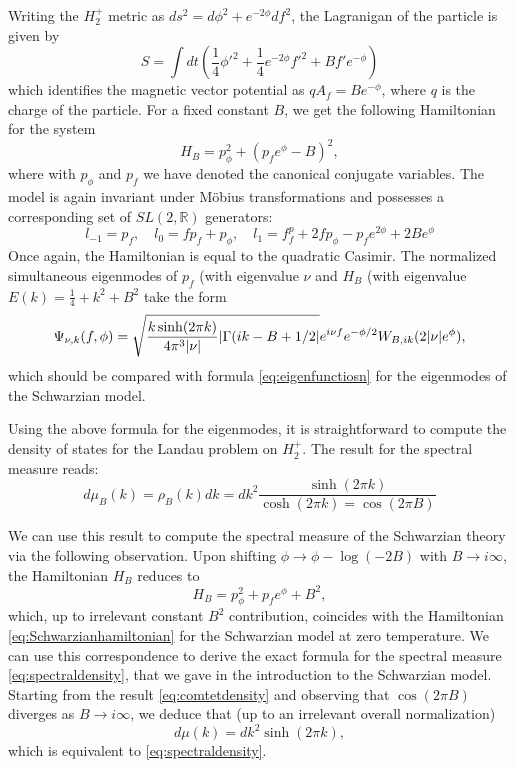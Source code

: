 Writing the $H^+_2$ metric as $ds^2 = d\phi^2 + e^{-2\phi}df^2$, the Lagranigan of the particle is given by 
\begin{equation}
S = \int{dt\left(\frac{1}{4}\phi'^2 + \frac{1}{4}e^{-2\phi}f'^2 + Bf'e^{-\phi}\right)}
\end{equation}
which identifies the magnetic vector potential as $qA_f = Be^{-\phi} $, where $q$ is the charge of the particle. For a fixed constant $B$, we get the following Hamiltonian for the system
\begin{equation}
H_B = p^2_\phi + (p_f e^\phi - B)^2,
\end{equation}
where with $p_\phi$ and $p_f$ we have denoted the canonical conjugate variables. The model is again invariant under Möbius transformations and possesses a corresponding set of $SL(2,\mathbb{R})$ generators:
\begin{equation}
l_{-1} = p_f,\quad l_0 = fp_f + p_\phi,\quad l_1 = f^p_f + 2fp_\phi - p_f e^{2\phi} + 2B e^\phi
\end{equation}
Once again, the Hamiltonian is equal to the quadratic Casimir. The normalized simultaneous eigenmodes of $p_f$ (with eigenvalue $\nu$ and $H_B$ (with eigenvalue $E(k) = \frac{1}{4} + k^2 + B^2$ take the form \cite{ComtetHouston85}
\begin{equation}
\Psi_{\nu,k}(f,\phi) = \sqrt{\frac{k\sinh(2\pi k)}{4\pi^3\abs{\nu}}\abs{\Gamma(ik-B+1/2}}e^{i\nu f}e^{-\phi/2}W_{B,ik}(2\abs{\nu}e^\phi),
\end{equation}
which should be compared with formula \eqref{eq:eigenfunctiosn} for the eigenmodes of the Schwarzian model.

Using the above formula for the eigenmodes, it is straightforward to compute the density of states for the Landau problem on $H^+_2$. The result for the spectral measure reads:
\begin{equation}
d\mu_B(k) = \rho_B(k)dk = dk^2\frac{\sinh(2\pi k)}{\cosh(2\pi k) = \cos(2\pi B)}
\label{eq:comtetdensity}
\end{equation}

We can use this result to compute the spectral measure of the Schwarzian theory via the following observation\cite{Kitaev16}. Upon shifting $\phi\rightarrow\phi - \log(-2B)$ with $B\rightarrow i\infty$, the Hamiltonian $H_B$ reduces to
\begin{equation}
H_B = p_\phi^2 + p_f e^\phi + B^2,
\end{equation}
which, up to irrelevant constant $B^2$ contribution, coincides with the Hamiltonian \eqref{eq:Schwarzianhamiltonian} for the Schwarzian model at zero temperature. We can use this correspondence to derive the exact formula for the spectral measure \eqref{eq:spectraldensity}, that we gave in the introduction to the Schwarzian model. Starting from the result \eqref{eq:comtetdensity} and observing that $\cos(2\pi B)$ diverges as $B\rightarrow i\infty$, we deduce that (up to an irrelevant overall normalization)
\begin{equation}
d\mu(k) = dk^2\sinh(2\pi k),
\end{equation}
which is equivalent to \eqref{eq:spectraldensity}.

